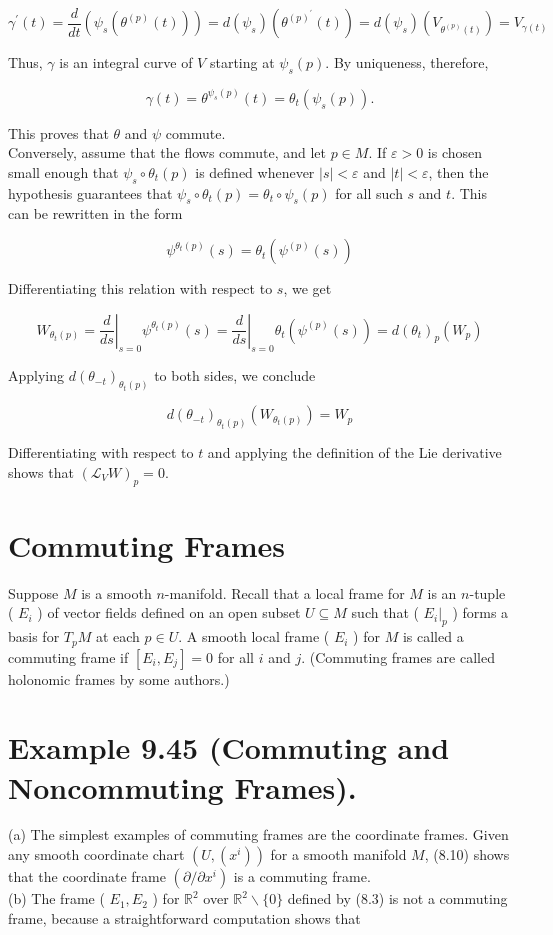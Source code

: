 \documentclass[10pt]{article}
\begin{document}
$$
\gamma^{\prime}(t)=\frac{d}{d t}\left(\psi_{s}\left(\theta^{(p)}(t)\right)\right)=d\left(\psi_{s}\right)\left(\theta^{(p)^{\prime}}(t)\right)=d\left(\psi_{s}\right)\left(V_{\theta^{(p)}(t)}\right)=V_{\gamma(t)}
$$

Thus, $\gamma$ is an integral curve of $V$ starting at $\psi_{s}(p)$. By uniqueness, therefore,

$$
\gamma(t)=\theta^{\psi_{s}(p)}(t)=\theta_{t}\left(\psi_{s}(p)\right) .
$$

This proves that $\theta$ and $\psi$ commute.\\
Conversely, assume that the flows commute, and let $p \in M$. If $\varepsilon>0$ is chosen small enough that $\psi_{s} \circ \theta_{t}(p)$ is defined whenever $|s|<\varepsilon$ and $|t|<\varepsilon$, then the hypothesis guarantees that $\psi_{s} \circ \theta_{t}(p)=\theta_{t} \circ \psi_{s}(p)$ for all such $s$ and $t$. This can be rewritten in the form

$$
\psi^{\theta_{t}(p)}(s)=\theta_{t}\left(\psi^{(p)}(s)\right)
$$

Differentiating this relation with respect to $s$, we get

$$
W_{\theta_{t}(p)}=\left.\frac{d}{d s}\right|_{s=0} \psi^{\theta_{t}(p)}(s)=\left.\frac{d}{d s}\right|_{s=0} \theta_{t}\left(\psi^{(p)}(s)\right)=d\left(\theta_{t}\right)_{p}\left(W_{p}\right)
$$

Applying $d\left(\theta_{-t}\right)_{\theta_{t}(p)}$ to both sides, we conclude

$$
d\left(\theta_{-t}\right)_{\theta_{t}(p)}\left(W_{\theta_{t}(p)}\right)=W_{p}
$$

Differentiating with respect to $t$ and applying the definition of the Lie derivative shows that $\left(\mathscr{L}_{V} W\right)_{p}=0$.

\section*{Commuting Frames}
Suppose $M$ is a smooth $n$-manifold. Recall that a local frame for $M$ is an $n$-tuple ( $E_{i}$ ) of vector fields defined on an open subset $U \subseteq M$ such that ( $\left.E_{i}\right|_{p}$ ) forms a basis for $T_{p} M$ at each $p \in U$. A smooth local frame ( $E_{i}$ ) for $M$ is called a commuting frame if $\left[E_{i}, E_{j}\right]=0$ for all $i$ and $j$. (Commuting frames are called holonomic frames by some authors.)

\section*{Example 9.45 (Commuting and Noncommuting Frames).}
(a) The simplest examples of commuting frames are the coordinate frames. Given any smooth coordinate chart $\left(U,\left(x^{i}\right)\right)$ for a smooth manifold $M$, (8.10) shows that the coordinate frame $\left(\partial / \partial x^{i}\right)$ is a commuting frame.\\
(b) The frame ( $E_{1}, E_{2}$ ) for $\mathbb{R}^{2}$ over $\mathbb{R}^{2} \backslash\{0\}$ defined by (8.3) is not a commuting frame, because a straightforward computation shows that
\end{document}
